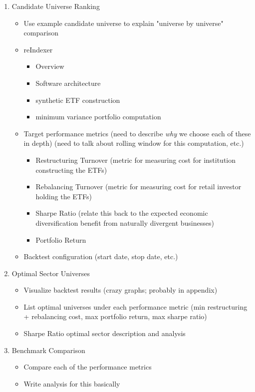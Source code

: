 \documentclass[../main.tex]{subfiles}
\begin{document}
\begin{enumerate}
    \item Candidate Universe Ranking
    \begin{itemize}
        \item Use example candidate universe to explain "universe by universe" comparison
        \item reIndexer
        \begin{itemize}
            \item Overview
            \item Software architecture
            \item synthetic ETF construction
            \item minimum variance portfolio computation
        \end{itemize}
        \item Target performance metrics (need to describe \textit{why} we choose each of these in depth) (need to talk about rolling window for this computation, etc.)
        \begin{itemize}
            \item Restructuring Turnover (metric for measuring cost for institution constructing the ETFs)
            \item Rebalancing Turnover (metric for measuring cost for retail investor holding the ETFs)
            \item Sharpe Ratio (relate this back to the expected economic diversification benefit from naturally divergent businesses)
            \item Portfolio Return
        \end{itemize}
        \item Backtest configuration (start date, stop date, etc.)
    \end{itemize}
    
    \item Optimal Sector Universes
    \begin{itemize}
        \item Visualize backtest results (crazy graphs; probably in appendix)
        \item List optimal universes under each performance metric (min restructuring + rebalancing cost, max portfolio return, max sharpe ratio)
        \item Sharpe Ratio optimal sector description and analysis
    \end{itemize}
    
    \item Benchmark Comparison
    \begin{itemize}
        \item Compare each of the performance metrics
        \item Write analysis for this basically
    \end{itemize}
    

\end{enumerate}
\end{document}
